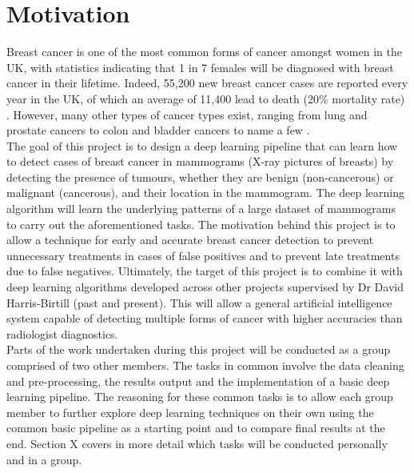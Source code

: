 \section{Motivation}

Breast cancer is one of the most common forms of cancer amongst women in the UK, with statistics indicating that 1 in 7 females will be diagnosed with breast cancer in their lifetime. Indeed, 55,200 new breast cancer cases are reported every year in the UK, of which an average of 11,400 lead to death (20\% mortality rate) \citep{BreastCancerResearchUK}. However, many other types of cancer types exist, ranging from lung and prostate cancers to colon and bladder cancers to name a few \citep{cokkinides2005american}.\\

The goal of this project is to design a deep learning pipeline that can learn how to detect cases of breast cancer in mammograms (X-ray pictures of breasts) by detecting the presence of tumours, whether they are benign (non-cancerous) or malignant (cancerous), and their location in the mammogram. The deep learning algorithm will learn the underlying patterns of a large dataset of mammograms to carry out the aforementioned tasks. The motivation behind this project is to allow a technique for early and accurate breast cancer detection to prevent unnecessary treatments in cases of false positives and to prevent late treatments due to false negatives. Ultimately, the target of this project is to combine it with deep learning algorithms developed across other projects supervised by Dr David Harris-Birtill (past and present). This will allow a general artificial intelligence system capable of detecting multiple forms of cancer with higher accuracies than radiologist diagnostics.\\

Parts of the work undertaken during this project will be conducted as a group comprised of two other members. The tasks in common involve the data cleaning and pre-processing, the results output and the implementation of a basic deep learning pipeline. The reasoning for these common tasks is to allow each group member to further explore deep learning techniques on their own using the common basic pipeline as a starting point and to compare final results at the end. Section X covers in more detail which tasks will be conducted personally and in a group.


